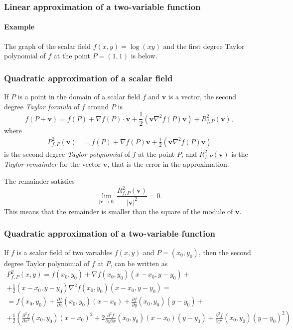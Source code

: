 \begin{frame}
\frametitle{Linear approximation of a two-variable function}
\framesubtitle{Example}
The graph of the scalar field $f(x,y)=\log(xy)$ and the first degree Taylor polynomial of $f$ at the point $P=(1,1)$ is below. 
\begin{center}

\end{center}
\end{frame}


\begin{frame}
\frametitle{Quadratic approximation of a scalar field}
If $P$ is a point in the domain of a scalar field $f$ and $\mathbf{v}$ is a vector, the second degree \emph{Taylor formula} of $f$ around $P$ is
\[
f(P+\mathbf{v}) = f(P) + \nabla f(P)\cdot \mathbf{v} + \frac{1}{2}\left(\mathbf{v}\nabla^2f(P)\mathbf{v}\right) + R^2_{f,P}(\mathbf{v}),
\]
where
\begin{align*}
P^2_{f,P}(\mathbf{v})&=f(P)+\nabla f(P)\mathbf{v}+\frac{1}{2}\left(\mathbf{v}\nabla^2f(P)\mathbf{v}\right)
\end{align*}
is the second degree \emph{Taylor polynomial} of $f$ at the point $P$, and $R^2_{f,P}(\mathbf{v})$ is the \emph{Taylor remainder} for the vector $\mathbf{v}$, that is the error in the approximation.

The remainder satisfies
\[
\lim_{|\mathbf{v}\rightarrow 0|} \frac{R^2_{f,P}(\mathbf{v})}{|\mathbf{v}|^2} = 0.
\]
This means that the remainder is smaller than the square of the module of $\mathbf{v}$.
\end{frame}


\begin{frame}
\frametitle{Quadratic approximation of a two-variable function}
If $f$ is a scalar field of two variables $f(x,y)$ and $P=(x_0,y_0)$, then the second degree Taylor polynomial of $f$ at $P$, can be written as
\begin{multline*}
P^2_{f,P}(x,y) = f(x_0,y_0)+\nabla f(x_0,y_0)(x-x_0,y-y_0) +\\
+\frac{1}{2}(x-x_0,y-y_0)\nabla^2f(x_0,y_0)(x-x_0,y-y_0)= \\
= f(x_0,y_0)+\frac{\partial f}{\partial x}(x_0,y_0)(x-x_0)+\frac{\partial f}{\partial y}(x_0,y_0)(y-y_0)+\\
+\frac{1}{2}\left(\frac{\partial^2 f}{\partial x^2}(x_0,y_0) (x-x_0)^2 + 2\frac{\partial^2 f}{\partial y\partial x}(x_0,y_0) (x-x_0)(y-y_0) + \frac{\partial^2 f}{\partial y^2}(x_0,y_0) (y-y_0)^2\right)
\end{multline*}
\end{frame}


